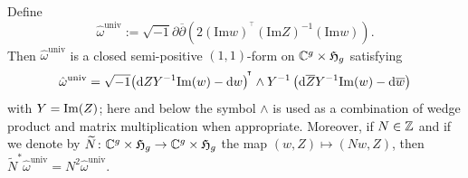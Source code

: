 \begin{lemma}\label{LemmaBettiOnUniversalCovering}
Define
\[
\hat{\omega}^{\mathrm{univ}}:=\sqrt{-1}\partial \overline{\partial} \left( 2 (\mathrm{Im}w)^{\!^{\intercal}} (\mathrm{Im} Z)^{-1} (\mathrm{Im}w) \right).
\]
Then $\hat{\omega}^{\mathrm{univ}}$ is a closed  semi-positive
$(1,1)$-form on ${\mathbb{C}}^g\times\mathfrak{H}_g$ satisfying %
\begin{equation}
  \label{eq:bettiformaltformula}
  \hat{\omega}^{\mathrm{univ}} = \sqrt{-1} {{\left( \mathrm{d} Z Y^{-1}
      \mathrm{Im}(w) - \mathrm{d} w\right)}}^{\!^{\intercal}} \wedge Y^{-1} \left( \mathrm{d} \overline Z Y^{-1}
    \mathrm{Im}(w) - \mathrm{d} \overline w\right)
\end{equation}
with $Y = \mathrm{Im}(Z)$; here and below the symbol $\wedge$
is used as a combination of wedge product and matrix multiplication
when appropriate. %
Moreover, if $N\in{\mathbb{Z}}$ and if we denote by $\widetilde{N} \colon {\mathbb{C}}^g \times \mathfrak{H}_g \rightarrow {\mathbb{C}}^g \times \mathfrak{H}_g$ the map $(w,Z) \mapsto (Nw,Z)$, then $\widetilde{N}^*\hat{\omega}^{\mathrm{univ}} = N^2\hat{\omega}^{\mathrm{univ}}$.
\end{lemma}
